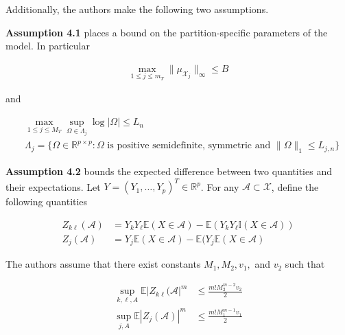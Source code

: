 \documentclass[12pt]{article}
\begin{document}
Additionally, the authors make the following two
assumptions.

\textbf{Assumption 4.1} places a bound on the
partition-specific parameters of the model. In particular

\begin{align}
  \max_{1\le j\le m_T} \|\mu_{\mathcal{X}_j}\|_\infty \le B
\end{align}

and

\begin{align}
  &\max_{1 \le j \le M_T} \sup_{\Omega \in \Lambda_j} \log |\Omega| \le L_n \\
  &\Lambda_j = \{\Omega \in \mathbb{R}^{p \times p} :
  \Omega \text{ is positive semidefinite, symmetric and } \|\Omega\|_1 \le L_{j,n}
  \}
\end{align}

\textbf{Assumption 4.2} bounds the expected difference between two
quantities and their expectations. Let $Y = (Y_1, \ldots, Y_p)^T \in
\mathbb{R}^p$. For any $\mathcal{A} \subset \mathcal{X}$, define the
following quantities

\begin{align}
  Z_{k\ell}(\mathcal{A}) &=
  Y_k Y_\ell \mathbb{E}(X \in \mathcal{A}) - \mathbb{E}(Y_k Y_\ell \mathbb{I}(X \in \mathcal{A})) \\
  Z_{j}(\mathcal{A}) &=
  Y_j \mathbb{E}(X \in \mathcal{A}) - \mathbb{E}(Y_j \mathbb{E}(X \in \mathcal{A})
\end{align}

The authors assume that there exist constants $M_1, M_2, v_1,$ and
$v_2$ such that

\begin{align}
  \sup_{k,\ell, A} \mathbb{E} | Z_{k\ell}(\mathcal{A}|^m &\le \frac{m! M_2^{m-2} v_2}{2} \\
  \sup_{j, A} \mathbb{E} | Z_j(\mathcal{A}) |^m &\le \frac{m! M_1^{m-1} v_1}{2}
\end{align}



%


\end{document}
